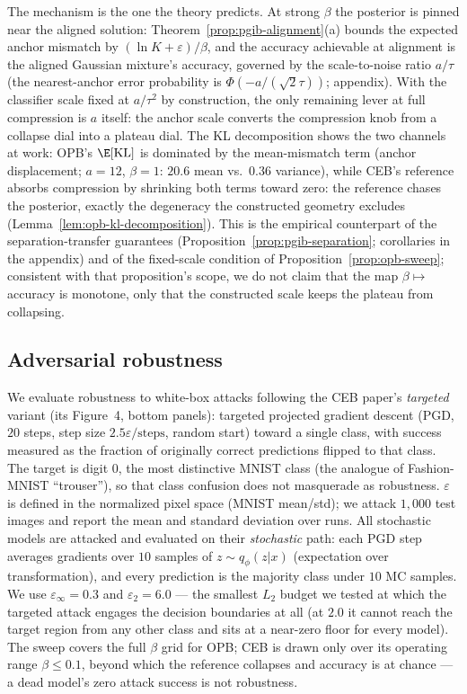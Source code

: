 \documentclass{article} %
\theoremstyle{plain}
\theoremstyle{remark}
\renewcommand{\KL}{\operatorname{KL}}
\begin{document}
The mechanism is the one the theory predicts. At strong $\beta$ the posterior is
pinned near the aligned solution: Theorem~\ref{prop:pgib-alignment}(a) bounds
the expected anchor mismatch by $(\ln K + \varepsilon)/\beta$, and the accuracy
achievable at alignment is the aligned Gaussian mixture's accuracy, governed by the
scale-to-noise ratio $a/\tau$ (the nearest-anchor error probability is
$\Phi(-a/(\sqrt{2}\tau))$; appendix). With the classifier scale
fixed at $a/\tau^2$ by construction, the only remaining lever at full compression is
$a$ itself: the anchor scale converts the compression knob from a collapse dial into
a plateau dial. The KL decomposition shows the two channels at work: OPB's $\E[\KL]$ is
dominated by the mean-mismatch term (anchor displacement; $a = 12$, $\beta = 1$:
$20.6$ mean vs.\ $0.36$ variance), while CEB's reference absorbs compression by
shrinking both terms toward zero: the reference chases the posterior, exactly the
degeneracy the constructed geometry excludes
(Lemma~\ref{lem:opb-kl-decomposition}). This is the empirical counterpart of the
separation-transfer guarantees (Proposition~\ref{prop:pgib-separation};
corollaries in the appendix) and of the fixed-scale condition of
Proposition~\ref{prop:opb-sweep}; consistent with that proposition's scope, we do
not claim that the map $\beta \mapsto$ accuracy is monotone, only that the
constructed scale keeps the plateau from collapsing.


\subsection{Adversarial robustness}
\label{sec:robustness}

We evaluate robustness to white-box attacks following the CEB paper's
\emph{targeted} variant (its Figure~4, bottom panels): targeted projected
gradient descent (PGD, $20$ steps, step size $2.5\varepsilon/\mathrm{steps}$,
random start) toward a single class, with success measured as the fraction of
originally correct predictions flipped to that class. The target is digit
$0$, the most distinctive MNIST class (the analogue of Fashion-MNIST
``trouser''), so that class confusion does not masquerade as robustness.
$\varepsilon$ is defined in the normalized pixel space (MNIST mean/std); we
attack $1{,}000$ test images and report the mean and standard deviation over
runs. All stochastic models are attacked and evaluated on their
\emph{stochastic} path: each PGD step averages gradients over $10$ samples of
$z \sim q_\phi(z|x)$ (expectation over transformation), and every prediction is
the majority class under $10$ MC samples. We use $\varepsilon_\infty = 0.3$ and
$\varepsilon_2 = 6.0$ --- the smallest $L_2$ budget we tested at which the
targeted attack engages the decision boundaries at all (at $2.0$ it cannot
reach the target region from any other class and sits at a near-zero floor for
every model). The sweep covers the full $\beta$ grid for OPB; CEB is drawn only
over its operating range $\beta \le 0.1$, beyond which the reference collapses
and accuracy is at chance --- a dead model's zero attack success is not
robustness.
\end{document}
